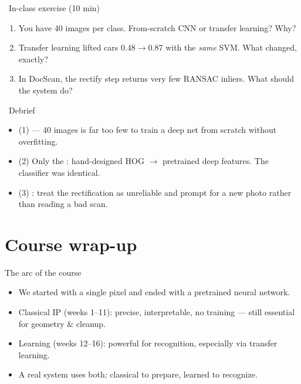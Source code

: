 \documentclass[10pt,aspectratio=169]{beamer}
\begin{document}
\begin{frame}{\faPen~In-class exercise (10 min)}
  \begin{infobox}
  \end{infobox}
  \begin{enumerate}
    \item You have 40 images per class. From-scratch CNN or transfer learning? Why?
    \item Transfer learning lifted cars 0.48$\rightarrow$0.87 with the \emph{same} SVM. What changed, exactly?
    \item In DocScan, the rectify step returns very few RANSAC inliers. What should the system do?
  \end{enumerate}
\end{frame}

\begin{frame}{\faPen~Debrief}
  \begin{itemize}
    \item (1)  — 40 images is far too few to train a deep net from scratch without overfitting.
    \item (2) Only the : hand-designed HOG $\rightarrow$ pretrained deep features. The classifier was identical.
    \item (3) : treat the rectification as unreliable and prompt for a new photo rather than reading a bad scan.
  \end{itemize}
\end{frame}

\section{Course wrap-up}

\begin{frame}{The arc of the course}
  \begin{itemize}
    \item We started with a single pixel and ended with a pretrained neural network.
    \item Classical IP (weeks 1--11): precise, interpretable, no training — still essential for geometry \& cleanup.
    \item Learning (weeks 12--16): powerful for recognition, especially via transfer learning.
    \item \alert{A real system uses both}: classical to prepare, learned to recognize.
  \end{itemize}
\end{frame}
\end{document}
